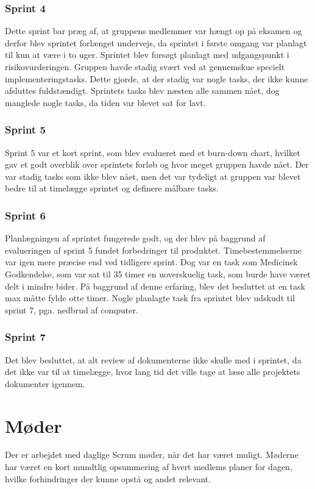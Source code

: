 \subsubsection{Sprint 4} 
Dette sprint bar præg af, at gruppens medlemmer var hængt op på eksamen og derfor blev sprintet forlænget undervejs, da sprintet i første omgang var planlagt til kun at være i to uger. Sprintet blev forsøgt planlagt med udgangspunkt i risikovurderingen. Gruppen havde stadig svært ved at gennemskue specielt implementeringstasks. Dette gjorde, at der stadig var nogle tasks, der ikke kunne afsluttes fuldstændigt. Sprintets tasks blev næsten alle sammen nået, dog manglede nogle tasks, da tiden var blevet sat for lavt. 

\subsubsection{Sprint 5} 
Sprint 5 var et kort sprint, som blev evalueret med et burn-down chart, hvilket gav et godt overblik over sprintets forløb og hvor meget gruppen havde nået. Der var stadig tasks som ikke blev nået, men det var tydeligt at gruppen var blevet bedre til at timelægge sprintet og definere målbare tasks.

\subsubsection{Sprint 6} 
Planlægningen af sprintet fungerede godt, og der blev på baggrund af evalueringen af sprint 5 fundet forbedringer til produktet. Timebestemmelserne var igen mere præcise end ved tidligere sprint. Dog var en task som Medicinsk Godkendelse, som var sat til 35 timer en uoverskuelig task, som burde have været delt i mindre bider. På baggrund af denne erfaring, blev det besluttet at en task max måtte fylde otte timer. Nogle planlagte task fra sprintet blev udskudt til sprint 7, pga. nedbrud af computer.   

\subsubsection{Sprint 7} 
Det blev besluttet, at alt review af dokumenterne ikke skulle med i sprintet, da det ikke var til at timelægge, hvor lang tid det ville tage at læse alle projektets dokumenter igennem. 
 
\section{Møder}
Der er arbejdet med daglige Scrum møder, når det har været muligt. Møderne har været en kort mundtlig opsummering af hvert medlems planer for dagen, hvilke forhindringer der kunne opstå og andet relevant. 

